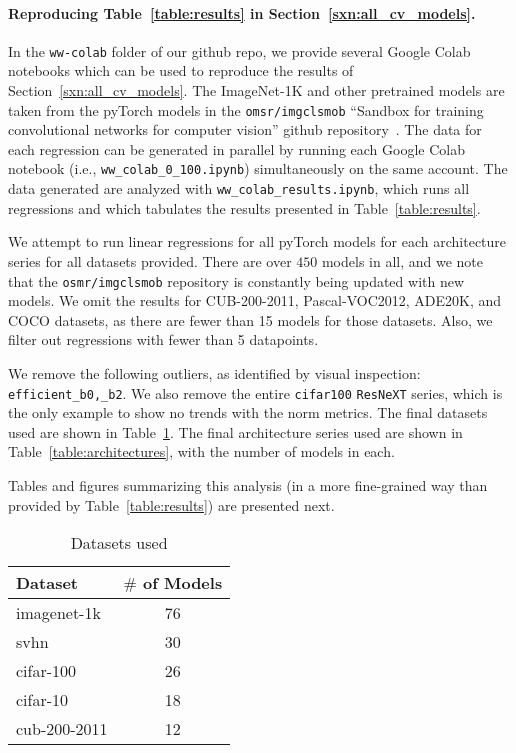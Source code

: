 \paragraph{Reproducing Table~\ref{table:results} in Section~\ref{sxn:all_cv_models}. }

In the \texttt{ww-colab} folder of our github repo, we provide several Google Colab notebooks which can be used to reproduce the results of Section~\ref{sxn:all_cv_models}.
The ImageNet-1K and other pretrained models are taken from the pyTorch models in the \texttt{omsr/imgclsmob} 
``Sandbox for training convolutional networks for computer vision'' github repository~\cite{osmr}.
The data for each regression can be generated in parallel by running each Google Colab notebook (i.e., \texttt{ww\_colab\_0\_100.ipynb}) simultaneously on the same account.
The data generated are analyzed with \texttt{ww\_colab\_results.ipynb}, which runs all regressions and which tabulates the results presented in Table~\ref{table:results}.

We attempt to run linear regressions for all pyTorch models for each architecture series for all datasets provided.  
There are over $450$ models in all, and we note that the \texttt{osmr/imgclsmob} repository is constantly being updated with new models.
We omit the results for CUB-200-2011, Pascal-VOC2012, ADE20K, and COCO datasets, as there are fewer than 15 models for those datasets.  
Also, we filter out regressions with fewer than 5 datapoints.

We remove the following outliers, as identified by visual inspection: \texttt{efficient\_b0,\_b2}.
We also remove the entire \texttt{cifar100} \texttt{ResNeXT} series, which is the only example to show no trends with the norm metrics.
%
The final datasets used are shown in Table~\ref{table:datasets}.
The final architecture series used are shown in  Table~\ref{table:architectures}, with the number of models in each.

Tables and figures summarizing this analysis (in a more fine-grained way than provided by Table~\ref{table:results}) are presented next.

\begin{table}[t]
\small
\begin{center}
\begin{tabular}{|p{1in}|c|}
\hline
Dataset & $\#$ of Models \\
\hline
imagenet-1k   &  76 \\
svhn          &  30 \\
cifar-100     &  26 \\
cifar-10      &  18 \\
cub-200-2011  &  12 \\
\hline
\end{tabular}
\end{center}
\caption{Datasets used }
\label{table:datasets}
\end{table}

